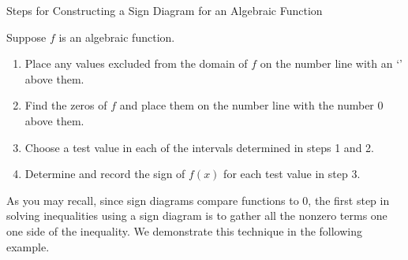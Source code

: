 \begin{floatbox}[label=box:]{Steps for Constructing a Sign Diagram for an Algebraic Function}

Suppose $f$ is an algebraic function. 

\begin{enumerate}

\item  Place any values excluded from the domain of  $f$ on the number line with an `\textinterrobang' above them.

\item  Find the zeros of $f$ and place them on the number line with the number $0$ above them.

\item  Choose a test value in each of the intervals determined in steps 1 and 2.

\item  Determine and record the sign of $f(x)$ for each test value in step 3.

\end{enumerate}

\end{floatbox}

As you may recall, since sign diagrams compare functions to $0$, the first step in solving inequalities using a sign diagram is to gather all the nonzero terms one one side of the inequality.  We demonstrate this technique in the following example.


